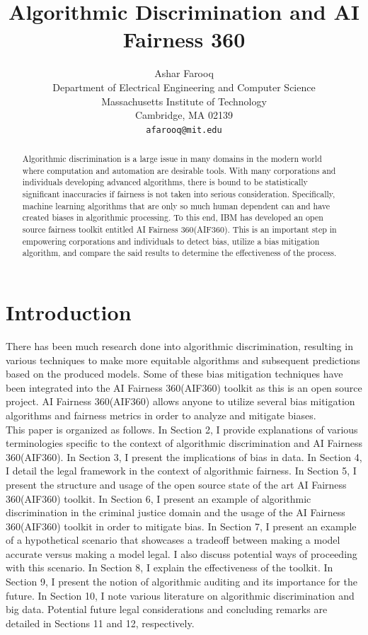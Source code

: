 \documentclass{article}
\title{Algorithmic Discrimination and AI Fairness 360}
\author{
  Ashar Farooq\\
  Department of Electrical Engineering and Computer Science\\
  Massachusetts Institute of Technology\\
  Cambridge, MA 02139 \\
  \texttt{afarooq@mit.edu} \\
}
\begin{document}
\maketitle
\begin{abstract}
Algorithmic discrimination is a large issue in many domains in the modern world where computation and automation are desirable tools. With many corporations and individuals developing advanced algorithms, there is bound to be statistically significant inaccuracies if fairness is not taken into serious consideration. Specifically, machine learning algorithms that are only so much human dependent can and have created biases in algorithmic processing. To this end, IBM has developed an open source fairness toolkit entitled AI Fairness 360(AIF360). This is an important step in empowering corporations and individuals to detect bias, utilize a bias mitigation algorithm, and compare the said results to determine the effectiveness of the process. 
\end{abstract}



\section{Introduction}
There has been much research done into algorithmic discrimination, resulting in various techniques to make more equitable algorithms and subsequent predictions based on the produced models. Some of these bias mitigation techniques have been integrated into the AI Fairness 360(AIF360) toolkit as this is an open source project. AI Fairness 360(AIF360) allows anyone to utilize several bias mitigation algorithms and fairness metrics in order to analyze and mitigate biases. 
\\

This paper is organized as follows. In Section 2, I provide explanations of various terminologies specific to the context of algorithmic discrimination and AI Fairness 360(AIF360). In Section 3, I present the implications of bias in data. In Section 4, I detail the legal framework in the context of algorithmic fairness. In Section 5, I present the structure and usage of the open source state of the art AI Fairness 360(AIF360) toolkit. In Section 6, I present an example of algorithmic discrimination in the criminal justice domain and the usage of the AI Fairness 360(AIF360) toolkit in order to mitigate bias. In Section 7, I present an example of a hypothetical scenario that showcases a tradeoff between making a model accurate versus making a model legal. I also discuss potential ways of proceeding with this scenario. In Section 8, I explain the effectiveness of the toolkit. In Section 9, I present the notion of algorithmic auditing and its importance for the future. In Section 10, I note various literature on algorithmic discrimination and big data. Potential future legal considerations and concluding remarks are detailed in Sections 11 and 12, respectively. 
\end{document}
